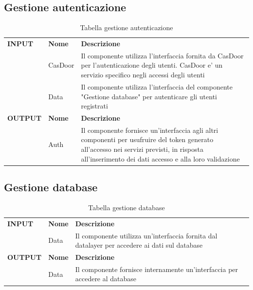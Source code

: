 \documentclass{article}
\begin{document}
\subsection{Gestione autenticazione}

\begin{table}[htbp]
    \centering
    \begin{tabularx}{\textwidth}{| l | l | X |}
        \Xhline{2pt}
        \textbf{INPUT} & \textbf{Nome} & \textbf{Descrizione} \\
        \Xhline{2pt}
         & CasDoor & Il componente utilizza l'interfaccia fornita da CasDoor per l'autenticazione degli utenti. CasDoor e' un servizio specifico negli accessi degli utenti \\
        \hline
         & Data & Il componente utilizza l’interfaccia del componente "Gestione database" per autenticare gli utenti registrati \\
        \Xhline{2pt}
        \textbf{OUTPUT} & \textbf{Nome} & \textbf{Descrizione} \\
        \Xhline{2pt}
         & Auth & Il componente fornisce un'interfaccia agli altri componenti per usufruire del token generato all'accesso nei servizi previsti, in risposta all’inserimento dei dati accesso e alla loro validazione \\
        \hline
    \end{tabularx}
    \caption{Tabella gestione autenticazione}
\end{table}

\subsection{Gestione database}

\begin{table}[htbp]
    \centering
    \begin{tabularx}{\textwidth}{| l | l | X |}
        \Xhline{2pt}
        \textbf{INPUT} & \textbf{Nome} & \textbf{Descrizione} \\
        \Xhline{2pt}
         & Data & Il componente utilizza un’interfaccia fornita dal datalayer per accedere ai dati sul database \\
        \Xhline{2pt}
        \textbf{OUTPUT} & \textbf{Nome} & \textbf{Descrizione} \\
        \Xhline{2pt}
         & Data & Il componente fornisce internamente un’interfaccia per accedere al database \\
        \hline
    \end{tabularx}
    \caption{Tabella gestione database}
\end{table}
\end{document}
